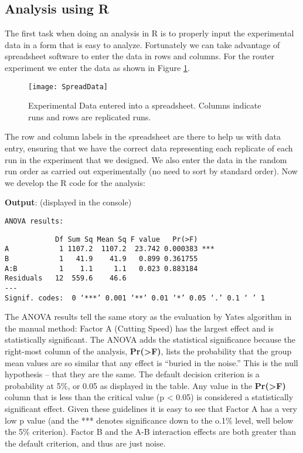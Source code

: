 \subsection{Analysis using R}
The first task when doing an analysis in R is to properly input the experimental data in a form that is easy to analyze. Fortunately we can take advantage of spreadsheet software to enter the data in rows and columns. For the router experiment we enter the data as shown in Figure \ref{spread}.

\begin{figure}
\begin{center}
		\texttt{[image: SpreadData]}
\end{center}
	\caption{Experimental Data entered into a spreadsheet. Columns indicate runs and rows are replicated runs.}\label{spread}
\end{figure}

The row and column labels in the spreadsheet are there to help us with data entry, ensuring that we have the correct data representing each replicate of each run in the experiment that we designed. We also enter the data in the random run order as carried out experimentally (no need to sort by standard order). Now we develop the R code for the analysis:



\noindent\textbf{Output}: (displayed in the console)

\noindent\texttt{ANOVA results:}

\begin{verbatim}
            Df Sum Sq Mean Sq F value   Pr(>F)    
A            1 1107.2  1107.2  23.742 0.000383 ***
B            1   41.9    41.9   0.899 0.361755    
A:B          1    1.1     1.1   0.023 0.883184    
Residuals   12  559.6    46.6                     
---
Signif. codes:  0 ‘***’ 0.001 ‘**’ 0.01 ‘*’ 0.05 ‘.’ 0.1 ‘ ’ 1
\end{verbatim}

The ANOVA results tell the same story as the evaluation by Yates algorithm in the manual method: Factor A (Cutting Speed) has the largest effect and is statistically significant. The ANOVA adds the statistical significance because the right-most column of the analysis, \textbf{Pr(>F)}, lists the probability that the group mean values are so similar that any effect is ``buried in the noise.'' This is the null hypothesis -- that they are the same. The default decision criterion is a probability at 5\%, or 0.05 as displayed in the table. Any value in the \textbf{Pr(>F)} column that is less than the critical value (p < 0.05) is considered a statistically significant effect. Given these guidelines it is easy to see that Factor A has a very low p value (and the *** denotes significance down to the o.1\% level, well below the 5\% criterion). Factor B and the A-B interaction effects are both greater than the default criterion, and thus are just noise.

